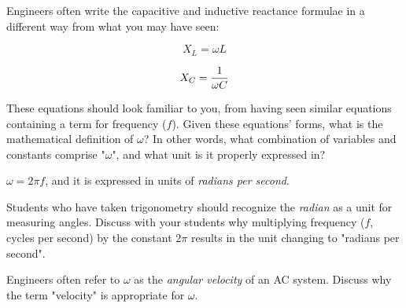 

Engineers often write the capacitive and inductive reactance formulae in a different way from what you may have seen:

$$X_L = \omega L$$

$$X_C = {1 \over {\omega C}}$$

These equations should look familiar to you, from having seen similar equations containing a term for frequency ($f$).  Given these equations' forms, what is the mathematical definition of $\omega$?  In other words, what combination of variables and constants comprise "$\omega$", and what unit is it properly expressed in?







$\omega = 2 \pi f$, and it is expressed in units of {\it radians per second}.







Students who have taken trigonometry should recognize the {\it radian} as a unit for measuring angles.  Discuss with your students why multiplying frequency ($f$, cycles per second) by the constant $2 \pi$ results in the unit changing to "radians per second".

Engineers often refer to $\omega$ as the {\it angular velocity} of an AC system.  Discuss why the term "velocity" is appropriate for $\omega$.





